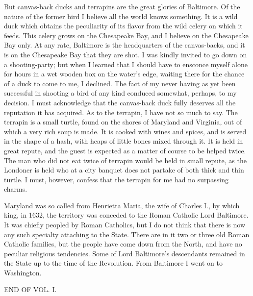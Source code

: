 But canvas-back ducks and terrapins are the great glories of
Baltimore.  Of the nature of the former bird I believe all the
world knows something.  It is a wild duck which obtains the
peculiarity of its flavor from the wild celery on which it feeds.
This celery grows on the Chesapeake Bay, and I believe on the
Chesapeake Bay only.  At any rate, Baltimore is the headquarters of
the canvas-backs, and it is on the Chesapeake Bay that they are
shot.  I was kindly invited to go down on a shooting-party; but
when I learned that I should have to ensconce myself alone for
hours in a wet wooden box on the water's edge, waiting there for
the chance of a duck to come to me, I declined.  The fact of my
never having as yet been successful in shooting a bird of any kind
conduced somewhat, perhaps, to my decision. I must acknowledge that
the canvas-back duck fully deserves all the reputation it has
acquired.  As to the terrapin, I have not so much to say.  The
terrapin is a small turtle, found on the shores of Maryland and
Virginia, out of which a very rich soup is made.  It is cooked with
wines and spices, and is served in the shape of a hash, with heaps
of little bones mixed through it.  It is held in great repute, and
the guest is expected as a matter of course to be helped twice.
The man who did not eat twice of terrapin would be held in small
repute, as the Londoner is held who at a city banquet does not
partake of both thick and thin turtle.  I must, however, confess
that the terrapin for me had no surpassing charms.

Maryland was so called from Henrietta Maria, the wife of Charles
I., by which king, in 1632, the territory was conceded to the Roman
Catholic Lord Baltimore.  It was chiefly peopled by Roman
Catholics, but I do not think that there is now any such specialty
attaching to the State.  There are in it two or three old Roman
Catholic families, but the people have come down from the North,
and have no peculiar religious tendencies.  Some of Lord
Baltimore's descendants remained in the State up to the time of the
Revolution.  From Baltimore I went on to Washington.


\bigskip
\begin{center}{\textsc{END OF VOL. I.}}\end{center}





